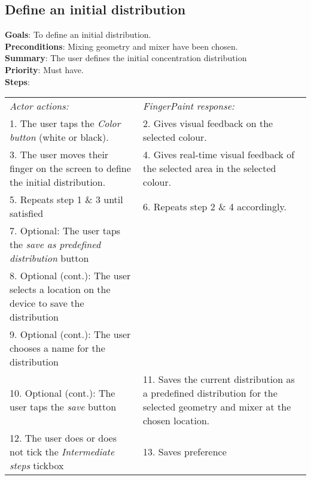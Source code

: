 \begin{appendices}
  \section{Define an initial distribution}
  \label{initdist}
  \textbf{Goals}: To define an initial distribution.\\
  \textbf{Preconditions}: Mixing geometry and mixer have been chosen.\\
  \textbf{Summary}: The user defines the initial concentration distribution\\
  \textbf{Priority}: Must have.\\
  \textbf{Steps}: \\
  \begin{tabular}{ p{} p{} }
  	\emph{Actor actions:} & \emph{FingerPaint response:} \\
	1. The user taps the \emph{Color button} (white or black). & 2. Gives visual feedback on the selected colour. \\
	3. The user moves their finger on the screen to define the initial distribution. & 4. Gives real-time visual feedback of the selected area in the selected colour.\\
    5. Repeats step 1 \& 3 until satisfied & 6.	Repeats step 2 \& 4 accordingly. \\
    7.	Optional: The user taps the \emph{save as predefined distribution} button  & \\
    8. Optional (cont.): The user selects a location on the device to save the distribution & \\
    9. Optional (cont.): The user chooses a name for the distribution & \\
    10. Optional (cont.): The user taps the \emph{save} button & 11. Saves the current distribution as a predefined distribution for the selected geometry and mixer at the chosen location.\\
    12.	The user does or does not tick the \emph{Intermediate steps} tickbox & 13. Saves preference
  \end{tabular}


\end{appendices}
